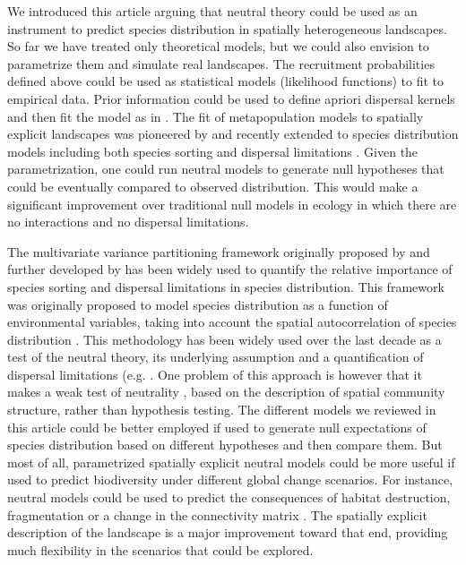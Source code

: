 \documentclass[12pt]{article}
\begin{document}
We introduced this article arguing that neutral theory could be used as an
instrument to predict species distribution in spatially heterogeneous
landscapes. So far we have treated only theoretical models, but we could also
envision to parametrize them and simulate real landscapes. The recruitment
probabilities defined above could be used as statistical models (likelihood
functions) to fit to empirical data. Prior information could be used to define
apriori dispersal kernels and then fit the model as in \textcite{Gravel2008}.
The fit of metapopulation models to spatially explicit landscapes was pioneered
by \textcite{Hanski1998} and recently extended to species distribution models
including both species sorting and dispersal limitations
\parencite{Boulangeat2012}. Given the parametrization, one could run neutral
models to generate null hypotheses that could be eventually compared to observed
distribution. This would make a significant improvement over traditional null
models in ecology \parencite{Gotelli1996} in which there are no interactions and no dispersal
limitations.

The multivariate variance partitioning framework originally proposed by
\textcite{Borcard1992} and further developed by \textcite{Borcard2002} has been
widely used to quantify the relative importance of species sorting and dispersal
limitations in species distribution. This framework was originally proposed to
model species distribution as a function of environmental variables, taking into
account the spatial autocorrelation of species distribution
\parencite{Leduc1992, Borcard1992, Legendre1993}. This methodology has been
widely used over the last decade as a test of the neutral theory, its underlying
assumption and a quantification of dispersal limitations (e.g.
\textcite{Svenning2004; Hardy2004; Gilbert2004; Cottenie2005}. One problem of
this approach is however that it makes a weak test of neutrality
\parencite{McGill200}, based on the description of spatial community structure,
rather than hypothesis testing. The different models we reviewed in this article
could be better employed if used to generate null expectations of species
distribution based on different hypotheses and then compare them. But most of
all, parametrized spatially explicit neutral models could be more useful if used
to predict biodiversity under different global change scenarios. For instance,
neutral models could be used to predict the consequences of habitat destruction,
fragmentation or a change in the connectivity matrix \parencite{Hubbell2008}.
The spatially explicit description of the landscape is a major improvement
toward that end, providing much flexibility in the scenarios that could be
explored.
\end{document}
